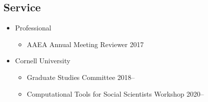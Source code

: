 \documentclass{res} %
\begin{document}
\begin{resume}
\section{Service}
\begin{itemize}
	\item[] Professional
	\vspace{-0.05in}
	\begin{itemize}
		\item[] AAEA Annual Meeting Reviewer \hfill 2017
	\end{itemize}
	\item[] Cornell University
	\vspace{-0.05in}
	\begin{itemize} \itemsep -1pt
		\item[]	Graduate Studies Committee \hfill 2018--
		\item[] Computational Tools for Social Scientists Workshop \hfill 2020--
	\end{itemize}
\end{itemize}
\vspace{-.075in}



\end{resume}
\end{document}
